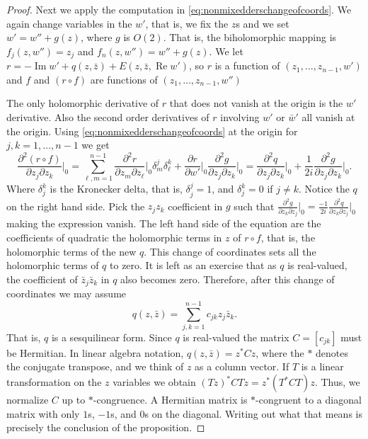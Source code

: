 \documentclass[12pt,openany]{book}
\renewcommand{\Re}{\operatorname{Re}}
\renewcommand{\Im}{\operatorname{Im}}
\theoremstyle{plain}
\theoremstyle{remark}
\theoremstyle{definition}
\theoremstyle{exercise}
\theoremstyle{example}
\begin{document}
\begin{proof}
Next we 
apply the computation in \eqref{eq:nonmixedderschangeofcoords}.
We again change variables in the $w'$, that is, we fix the $z$s and we set
$w' = w'' + g(z)$, where $g$ is $O(2)$.  
That is, the biholomorphic mapping is
$f_j(z,w'') = z_j$ and $f_n(z,w'') = w'' +g(z)$.
We let $r = - \Im w' + q(z,\bar{z}) + E(z,\bar{z},\Re w')$, so
$r$ is a function of $(z_1,\ldots,z_{n-1},w')$ and
$f$ and $(r \circ f)$ are functions of $(z_1,\ldots,z_{n-1},w'')$

The only
holomorphic derivative of $r$ that does not vanish at the origin is the $w'$
derivative.  Also the second order derivatives of $r$ involving $w'$ or
$\bar{w}'$ all vanish at the origin.
Using
\eqref{eq:nonmixedderschangeofcoords} at the origin for
$j,k=1,\ldots,n-1$ we get
\begin{equation*}
\frac{\partial^2 (r \circ f)}{\partial z_j \partial z_k}
\Big|_0 = 
\sum_{\ell,m=1}^{n-1} \frac{\partial^2 r}{\partial z_m \partial z_\ell}
\Big|_0
\delta_{m}^j \delta_{\ell}^k
+
\frac{\partial r}{\partial w'} \Big|_0
\frac{\partial^2 g}{\partial z_j \partial z_k} \Big|_0
=
\frac{\partial^2 q}{\partial z_j \partial z_k} \Big|_0
+
\frac{1}{2i} 
\frac{\partial^2 g}{\partial z_j \partial z_k} \Big|_0 .
\end{equation*}
Where $\delta_{j}^k$ is the Kronecker delta, that is, $\delta_j^j = 1$,
and $\delta_j^k = 0$ if $j \not= k$.  Notice the $q$ on the right hand
side.
Pick the $z_j z_k$ coefficient in $g$
such that $\frac{\partial^2 g}{\partial z_k \partial z_j} \big|_0 =
\frac{-1}{2i} \frac{\partial^2 q}{\partial z_k \partial z_j} \big|_0$
making the expression vanish.
The left hand side of the equation are the coefficients of
quadratic the holomorphic terms in $z$ of $r \circ f$, that is, the
holomorphic terms of the new $q$.
This change of coordinates
sets all the holomorphic terms of $q$ to zero.
It is left as an exercise that as $q$ is real-valued,
the coefficient of $\bar{z}_j \bar{z}_k$ in $q$ also becomes zero.
Therefore, after this change of coordinates we may assume
\begin{equation*}
q(z,\bar{z}) = \sum_{j,k=1}^{n-1} c_{jk} z_j \bar{z}_k .
\end{equation*}
That is, $q$ is a sesquilinear form.  Since $q$ is real-valued the matrix
$C = [ c_{jk} ]$ must be Hermitian.  In linear algebra notation,
$q(z,\bar{z}) = z^*Cz$, where the $*$ denotes the conjugate transpose,
and we think of $z$ as a column vector.
If $T$ is a linear transformation on the $z$ variables we
obtain ${(Tz)}^*CTz = z^* ( T^*CT) z$.  Thus, we normalize $C$
up to $*$-congruence.  A Hermitian matrix
is $*$-congruent to a diagonal matrix with only $1$s, $-1$s, and $0$s on the
diagonal.  Writing out what that means is precisely the conclusion of the
proposition.
\end{proof}
\end{document}
